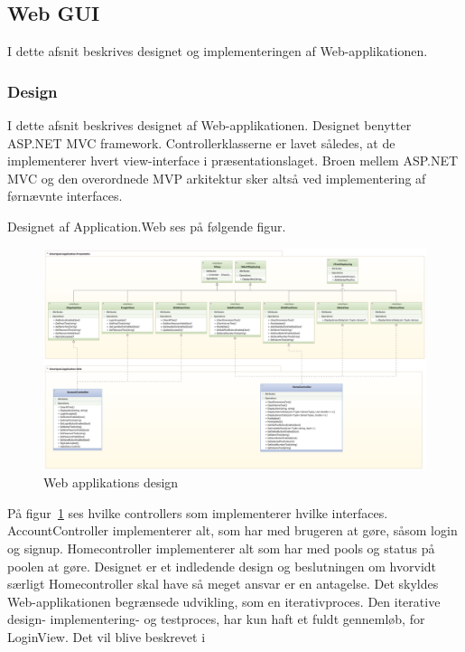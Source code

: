 \subsection{Web GUI}
I dette afsnit beskrives designet og implementeringen af Web-applikationen.

\subsubsection{Design}
I dette afsnit beskrives designet af Web-applikationen. Designet benytter ASP.NET MVC framework. Controllerklasserne er lavet således, at de implementerer hvert view-interface i præsentationslaget. Broen mellem ASP.NET MVC og den overordnede MVP arkitektur sker altså ved implementering af førnævnte interfaces.

Designet af Application.Web ses på følgende figur.

\begin{landscape}
\begin{figure}
	\centering
	\includegraphics[width=1\linewidth]{figs/design/application_web}
	\caption{Web applikations design}
	\label{fig:web_class}
\end{figure}
\end{landscape}
På figur~\ref{fig:web_class} ses hvilke controllers som implementerer hvilke interfaces. AccountController implementerer alt, som har med brugeren at gøre, såsom login og signup. Homecontroller implementerer alt som har med pools og status på poolen at gøre. Designet er et indledende design og beslutningen om hvorvidt særligt Homecontroller skal have så meget ansvar er en antagelse. Det skyldes Web-applikationen begrænsede udvikling, som en iterativproces. Den iterative design- implementering- og testproces, har kun haft et fuldt gennemløb, for LoginView. Det vil blive beskrevet i 

